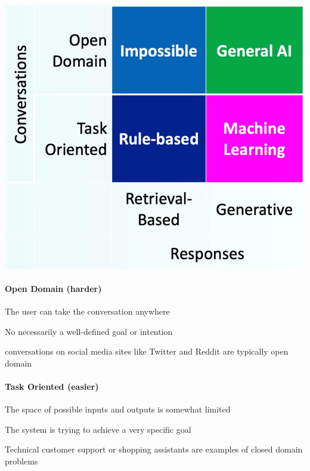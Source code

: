 \documentclass[10pt]{report}
\begin{document}
\begin{center}
	\includegraphics[scale=0.33]{115.png}
\end{center}
\pagebreak
\begin{multicols}{2}
\paragraph{Open Domain (harder)}
\begin{list}{}{}
	\item The user can take the conversation anywhere
	\item No necessarily a well-defined goal or intention
	\item conversations on social media sites like Twitter and Reddit are typically open domain
\end{list}
\paragraph{Task Oriented (easier)}
\begin{list}{}{}
	\item The space of possible inputs and outputs is somewhat limited
	\item The system is trying to achieve a very specific goal
	\item Technical customer support or shopping assistants are examples of closed domain problems
\end{list}
\end{multicols}
\end{document}
